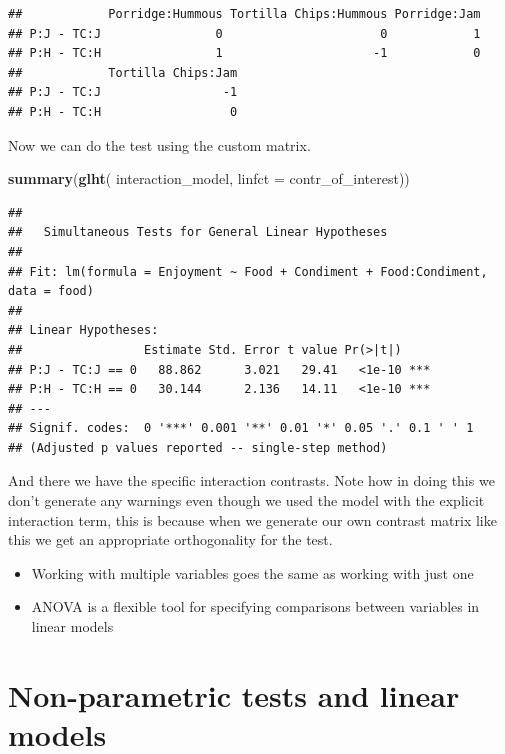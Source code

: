 \documentclass[
]{book}
\newenvironment{Shaded}{\begin{snugshade}}{\end{snugshade}}
\newcommand{\DataTypeTok}[1]{\textcolor[rgb]{0.13,0.29,0.53}{#1}}
\newcommand{\KeywordTok}[1]{\textcolor[rgb]{0.13,0.29,0.53}{\textbf{#1}}}
\newcommand{\NormalTok}[1]{#1}
\providecommand{\tightlist}{%
  \setlength{\itemsep}{0pt}\setlength{\parskip}{0pt}}
\newenvironment{task}
{ \begin{tcolorbox}[title=For you to do,title filled] }
{  \end{tcolorbox} }
\newenvironment{roundup}
{ \begin{tcolorbox}[colbacktitle=yellow!50!white,
title=Round Up,coltitle=black,
fonttitle=\bfseries] }
{  \end{tcolorbox} }
\begin{document}
\begin{verbatim}
##            Porridge:Hummous Tortilla Chips:Hummous Porridge:Jam
## P:J - TC:J                0                      0            1
## P:H - TC:H                1                     -1            0
##            Tortilla Chips:Jam
## P:J - TC:J                 -1
## P:H - TC:H                  0
\end{verbatim}

Now we can do the test using the custom matrix.

\begin{Shaded}
\begin{Highlighting}[]
\KeywordTok{summary}\NormalTok{(}\KeywordTok{glht}\NormalTok{( interaction_model, }\DataTypeTok{linfct =}\NormalTok{ contr_of_interest))}
\end{Highlighting}
\end{Shaded}

\begin{verbatim}
## 
## 	 Simultaneous Tests for General Linear Hypotheses
## 
## Fit: lm(formula = Enjoyment ~ Food + Condiment + Food:Condiment, data = food)
## 
## Linear Hypotheses:
##                 Estimate Std. Error t value Pr(>|t|)    
## P:J - TC:J == 0   88.862      3.021   29.41   <1e-10 ***
## P:H - TC:H == 0   30.144      2.136   14.11   <1e-10 ***
## ---
## Signif. codes:  0 '***' 0.001 '**' 0.01 '*' 0.05 '.' 0.1 ' ' 1
## (Adjusted p values reported -- single-step method)
\end{verbatim}

And there we have the specific interaction contrasts. Note how in doing this we don't generate any warnings even though we used the model with the explicit interaction term, this is because when we generate our own contrast matrix like this we get an appropriate orthogonality for the test.

\begin{roundup}
\begin{itemize}
\tightlist
\item
  Working with multiple variables goes the same as working with just one
\item
  ANOVA is a flexible tool for specifying comparisons between variables in linear models
\end{itemize}
\end{roundup}

\begin{task}
\end{task}

\hypertarget{non-parametric-tests-and-linear-models}{%
\chapter{Non-parametric tests and linear models}\label{non-parametric-tests-and-linear-models}}
\end{document}
